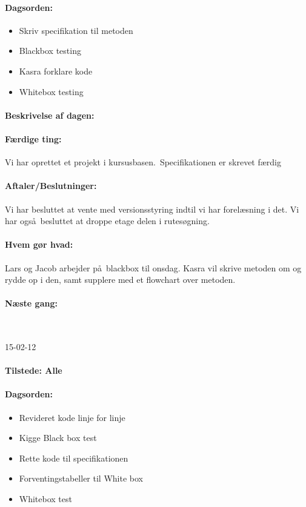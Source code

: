 \documentclass[a4paper,10pt,titlepage]{article}
\begin{document}
				\paragraph{Dagsorden:}
				\begin{itemize}
					\item Skriv specifikation til metoden
					\item Blackbox testing
					\item Kasra forklare kode
					\item Whitebox testing
				\end{itemize}
				
			\paragraph{Beskrivelse af dagen:}
			
			\paragraph{F\ae rdige ting:}
			Vi har oprettet et projekt i kursusbasen.\
			Specifikationen er skrevet f\ae rdig
			
			\paragraph{Aftaler/Beslutninger:}
			Vi har besluttet at vente med versionsstyring indtil vi har forel\ae sning i det. Vi har ogs\aa \ besluttet at droppe etage delen i rutes\o gning. 
			
			\paragraph{Hvem g\o r hvad:}
			Lars og Jacob arbejder p\aa \ blackbox til onsdag. Kasra vil skrive metoden om og rydde op i den, samt supplere med et flowchart over metoden.
			\paragraph{N\ae ste gang:}\mbox{}\\
			
			\begin{center}
		15-02-12
		\end{center}
				\paragraph{Tilstede: Alle}
				\paragraph{Dagsorden:}
				\begin{itemize}
					\item Revideret kode linje for linje
					\item Kigge Black box test
					\item Rette kode til specifikationen
					\item Forventingstabeller til White box
					\item Whitebox test
				\end{itemize}
				
\end{document}
